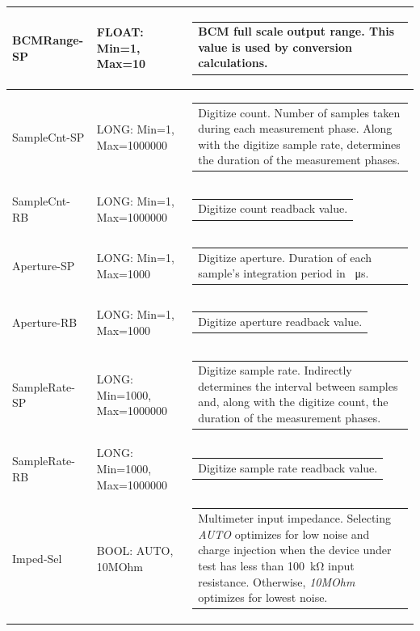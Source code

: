 \documentclass[openany]{article}
\begin{document}
\begin{longtable}{| m{3.0cm} m{4.5cm} m{7.0cm} |}
		BCMRange-SP & FLOAT: Min=1, Max=10 & \begin{tabular}{@{}m{6cm}@{}}
	    					BCM full scale output range. This value is used by conversion calculations.
						\end{tabular} \\ \hline
		SampleCnt-SP & LONG: Min=1, Max=1000000 & \begin{tabular}{@{}m{6cm}@{}}
	    					Digitize count. Number of samples taken during each measurement phase. Along with the digitize sample rate, determines the duration of the measurement phases.
						\end{tabular} \\ \hline
		SampleCnt-RB & LONG: Min=1, Max=1000000 & \begin{tabular}{@{}m{6cm}@{}}
	    					Digitize count readback value.
						\end{tabular} \\ \hline
		Aperture-SP & LONG: Min=1, Max=1000 & \begin{tabular}{@{}m{6cm}@{}}
	    					Digitize aperture. Duration of each sample's integration period in \SI{}{\micro\second}.
						\end{tabular} \\ \hline
		Aperture-RB & LONG: Min=1, Max=1000 & \begin{tabular}{@{}m{6cm}@{}}
	    					Digitize aperture readback value.
						\end{tabular} \\ \hline
		SampleRate-SP & LONG: Min=1000, Max=1000000 & \begin{tabular}{@{}m{6cm}@{}}
	    					Digitize sample rate. Indirectly determines the interval between samples and, along with the digitize count, the duration of the measurement phases.
						\end{tabular} \\ \hline
		SampleRate-RB & LONG: Min=1000, Max=1000000 & \begin{tabular}{@{}m{6cm}@{}}
	    					Digitize sample rate readback value.
						\end{tabular} \\ \hline
		Imped-Sel & BOOL: AUTO, 10MOhm & \begin{tabular}{@{}m{6cm}@{}}
	    					Multimeter input impedance. Selecting \emph{AUTO} optimizes for low noise and charge injection when the device under test has less than \SI{100}{\kohm} input resistance. Otherwise, \emph{10MOhm} optimizes for lowest noise.

\end{tabular}
\end{longtable}
\end{document}
